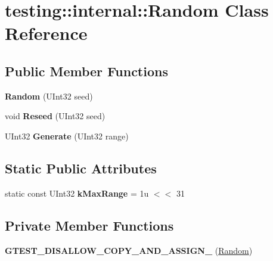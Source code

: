 \hypertarget{classtesting_1_1internal_1_1_random}{}\section{testing\+:\+:internal\+:\+:Random Class Reference}
\label{classtesting_1_1internal_1_1_random}
\subsection*{Public Member Functions}
\begin{DoxyCompactItemize}
\item 
\mbox{\label{classtesting_1_1internal_1_1_random_a6e112be5e7cce00551f6383025f69460}} 
{\bfseries Random} (U\+Int32 seed)
\item 
\mbox{\label{classtesting_1_1internal_1_1_random_adf2f24199318a46f885c78f50d89a69e}} 
void {\bfseries Reseed} (U\+Int32 seed)
\item 
\mbox{\label{classtesting_1_1internal_1_1_random_a9315b7fb621cbcfdf92ed4b5e584c0db}} 
U\+Int32 {\bfseries Generate} (U\+Int32 range)
\end{DoxyCompactItemize}
\subsection*{Static Public Attributes}
\begin{DoxyCompactItemize}
\item 
\mbox{\label{classtesting_1_1internal_1_1_random_a36d72dd7063d0b5338f229e75382fdd2}} 
static const U\+Int32 {\bfseries k\+Max\+Range} = 1u $<$$<$ 31
\end{DoxyCompactItemize}
\subsection*{Private Member Functions}
\begin{DoxyCompactItemize}
\item 
\mbox{\label{classtesting_1_1internal_1_1_random_aa2f476d8cfe29f928b90d7339c849734}} 
{\bfseries G\+T\+E\+S\+T\+\_\+\+D\+I\+S\+A\+L\+L\+O\+W\+\_\+\+C\+O\+P\+Y\+\_\+\+A\+N\+D\+\_\+\+A\+S\+S\+I\+G\+N\+\_\+} (\hyperlink{classtesting_1_1internal_1_1_random}{Random})
\end{DoxyCompactItemize}
